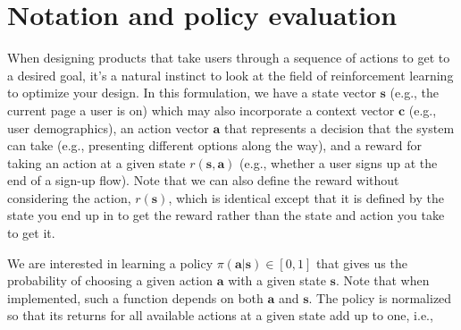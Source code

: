 \documentclass{article}
\begin{document}
\section{Notation and policy evaluation}

When designing products that take users through a sequence of actions to get to a desired goal, it’s a natural instinct to look at the field of reinforcement learning to optimize your design. In this formulation, we have a state vector $\mathbf{s}$ (e.g., the current page a user is on) which may also incorporate a context vector $\mathbf{c}$ (e.g., user demographics), an action vector $\mathbf{a}$ that represents a decision that the system can take (e.g., presenting different options along the way), and a reward for taking an action at a given state $r(\mathbf{s},\mathbf{a})$ (e.g., whether a user signs up at the end of a sign-up flow). Note that we can also define the reward without considering the action, $r(\mathbf{s})$, which is identical except that it is defined by the state you end up in to get the reward rather than the state and action you take to get it. 

We are interested in learning a policy $\pi(\mathbf{a}| \mathbf{s})\in [0,1]$ that gives us the probability of choosing a given action $\mathbf{a}$ with a given state $\mathbf{s}$. Note that when implemented, such a function depends on both $\mathbf{a}$ and $\mathbf{s}$. The policy is normalized so that its returns for all available actions at a given state add up to one, i.e.,
\end{document}
